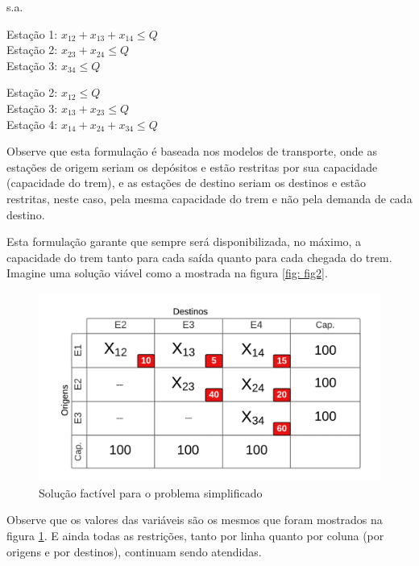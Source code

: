 s.a.


Estação 1: $x_{12} + x_{13} + x_{14} \leq Q $ \\
\indent Estação 2: $x_{23} + x_{24}  \leq  Q $ \\
\indent Estação 3: $x_{34} \leq Q $


Estação 2: $x_{12} \leq Q $ \\
\indent Estação 3: $x_{13} + x_{23}  \leq  Q $ \\
\indent Estação 4: $x_{14} + x_{24} + x_{34} \leq Q $

Observe que esta formulação é baseada nos modelos de transporte, onde as estações de origem seriam os depósitos e estão restritas por sua capacidade (capacidade do trem), e as estações de destino seriam os destinos e estão restritas, neste caso, pela mesma capacidade do trem e não pela demanda de cada destino.

Esta formulação garante que sempre será disponibilizada, no máximo, a capacidade do trem tanto para cada saída quanto para cada chegada do trem. Imagine uma solução viável como a mostrada na figura \ref{fig: fig2}.

\begin{figure}[h]
	\begin{center}
		\includegraphics[scale=0.4]{img/fig3.png}
		\caption{Solução factível para o problema simplificado}
		\label{fig: fig3}
	\end{center}
\end{figure}

Observe que os valores das variáveis são os mesmos que foram mostrados na figura \ref{fig: fig3}. E ainda todas as restrições, tanto por linha quanto por coluna (por origens e por destinos), continuam sendo atendidas.

